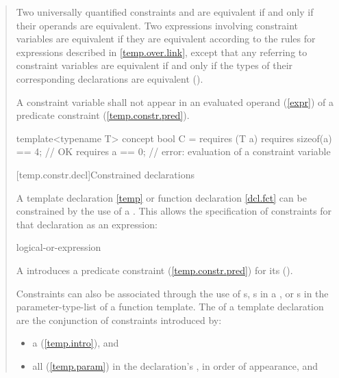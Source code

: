 \begin{quote}
\pnum
Two universally quantified constraints  and  are equivalent 
if and only if their operands are equivalent.
% 
Two expressions involving constraint variables are equivalent if they
are equivalent according to the rules for expressions described in 
\ref{temp.over.link}, except that any  referring to 
constraint variables are equivalent if and only if the types of their 
corresponding declarations are equivalent ().

\pnum
A constraint variable shall not appear in an evaluated operand 
(\ref{expr}) of a predicate constraint (\ref{temp.constr.pred}).
\enterexample
\begin{codeblock}
template<typename T> 
  concept bool C = requires (T a) {
    requires sizeof(a) == 4; // OK
    requires a == 0;         // error: evaluation of a constraint variable
  }
\end{codeblock}
\exitexample


[temp.constr.decl]{Constrained declarations}

\pnum
A template declaration \ref{temp} or function declaration \ref{dcl.fct} can 
be constrained by the use of a .
This allows the specification of constraints for that declaration as
an expression:

\begin{bnf}
\br
    logical-or-expression
\end{bnf}

A  introduces a predicate constraint
(\ref{temp.constr.pred}) for its 
().

\pnum
Constraints can also be associated through the use of 
s, 
s in a 
, or 
s in the parameter-type-list
of a function template.
% 
The  of a template declaration are 
the conjunction of constraints introduced by:
% 
\begin{itemize}
\item a  (\ref{temp.intro}), 
      and

\item all  
      (\ref{temp.param}) in the declaration's 
      , in 
      order of appearance, and


\end{itemize}
\end{quote}
